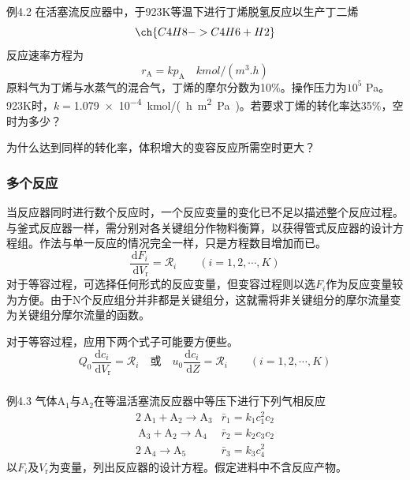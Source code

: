 \documentclass[dvipsnames, svgnames, x11names]{beamer}
\begin{document}
\begin{frame}[t]
    \frametitle{}
    \begin{block}{例4.2}
        在活塞流反应器中，于923K等温下进行丁烯脱氢反应以生产丁二烯
        \[
            \ch{C4H8 -> C4H6 + H2}
        \]
        反应速率方程为
        \[
            r_\mathrm{A} = kp_\mathrm{A} \quad \si{kmol/(m^3.h)}
        \]
        原料气为丁烯与水蒸气的混合气，丁烯的摩尔分数为10\%。操作压力为$10^5$ Pa。923K时，$k=$\SI{1.079e-4}{kmol/(h.m^2.Pa)}。若要求丁烯的转化率达35\%，空时为多少？
    \end{block}
    \pause
    \begin{question}
        为什么达到同样的转化率，体积增大的变容反应所需空时更大？
    \end{question}
\end{frame}


\begin{frame}
    \frametitle{多个反应}

    当反应器同时进行数个反应时，一个反应变量的变化已不足以描述整个反应过程。与釜式反应器一样，需分别对各关键组分作物料衡算，以获得管式反应器的设计方程组。作法与单一反应的情况完全一样，只是方程数目增加而已。
    \[
        \frac{\mathrm{d} F_{i}}{\mathrm{~d} V_{\mathrm{r}}}=\mathscr{R}_{i} \qquad(i=1,2, \cdots, K)
    \]
    对于等容过程，可选择任何形式的反应变量，但变容过程则以选$F_{i}$作为反应变量较为方便。由于N个反应组分并非都是关键组分，这就需将非关键组分的摩尔流量变为关键组分摩尔流量的函数。

    对于等容过程，应用下两个式子可能要方便些。
    \[
       Q_0\frac{\mathrm{d} c_{i}}{\mathrm{~d} V_{\mathrm{r}}}=\mathscr{R}_{i} \quad \text{或} \quad u_0\frac{\mathrm{d} c_{i}}{\mathrm{~d} Z}=\mathscr{R}_{i} \qquad(i=1,2, \cdots, K)
    \]

\end{frame}


\begin{frame}[t]
    \frametitle{}

    \begin{block}{例4.3}
        气体A$_1$与A$_2$在等温活塞流反应器中等压下进行下列气相反应
        \[\begin{array}{ll}
            2 \mathrm{~A}_{1}+\mathrm{A}_{2} \longrightarrow \mathrm{A}_{3} & \bar{r}_1=k_{1} c_{1}^{2} c_{2} \\
            \mathrm{~A}_{3}+\mathrm{A}_{2} \longrightarrow \mathrm{A}_{4} & \bar{r}_2=k_{2} c_{3} c_{2} \\
            2 \mathrm{~A}_{4} \longrightarrow \mathrm{A}_{5} & \bar{r}_3=k_{3} c_{4}^{2}
            \end{array}
        \]
        以$F_i$及$V_\mathrm{r}$为变量，列出反应器的设计方程。假定进料中不含反应产物。
    \end{block}

\end{frame}
\end{document}
